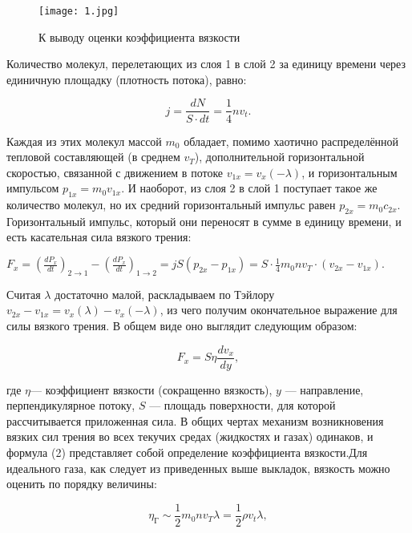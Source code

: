 \documentclass{article}
\begin{document}
\begin{figure}[htp]
\centering
\texttt{[image: 1.jpg]}
\caption{К выводу оценки коэффициента вязкости}
\end{figure}


Количество молекул, перелетающих из слоя 1 в слой 2 за единицу времени через единичную площадку ({\bold плотность потока}), равно:

\begin{equation}
        j = \frac{dN}{S \cdot dt} = \frac{1}{4} n v_t.
\end{equation}

Каждая из этих молекул массой $m_0$ обладает, помимо хаотично распределённой тепловой составляющей (в среднем $v_T$), дополнительной горизонтальной скоростью, связанной с движением в потоке $v_{1 x} = v_x(-\lambda)$, и горизонтальным импульсом $p_{1 x} = m_0 v_{1 x}$.
И наоборот, из слоя 2 в слой 1 поступает такое же количество молекул, но их средний горизонтальный импульс равен $p_{2 x} = m_0 c_{2 x}$. Горизонтальный импульс, который они переносят в сумме в единицу времени, и есть касательная сила вязкого трения:



$F_x = (\frac{dP_x}{dt})_{2 \to 1}  - (\frac{dP_x}{dt})_{1 \to 2} = j S (p_{2 x} - p_{1 x}) = S \cdot \frac{1}{4} m_0 n v_T \cdot (v_{2 x} - v_{1 x}).$



Считая $\lambda$ достаточно  малой,  раскладываем  по  Тэйлору $v_{2 x} - v_{1 x} = v_{x}(\lambda) - v_{x}(-\lambda)$, из чего получим окончательное
выражение для силы вязкого трения. В общем виде оно выглядит
следующим образом:

\begin{equation}
        F_x = S \eta \frac{d v_x}{dy}, 
\end{equation}

где $\eta$— коэффициент вязкости (сокращенно вязкость), $y$ — направление, перпендикулярное потоку, $S$ — площадь поверхности, для которой рассчитывается приложенная сила. В общих чертах механизм возникновения вязких сил трения во всех текучих средах (жидкостях и газах) одинаков, и формула (2) представляет собой определение
коэффициента вязкости.Для идеального газа, как следует из приведенных выше выкладок, вязкость можно оценить
по порядку величины:

\begin{equation}
        \eta_{Г} \sim \frac{1}{2} m_0 n v_T \lambda = \frac{1}{2} \rho v_t \lambda, 
\end{equation}
\end{document}
